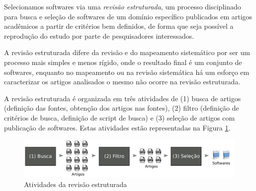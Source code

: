 Selecionamos softwares via uma {\it
revisão estruturada}, um processo disciplinado para busca e seleção de
softwares de um domínio específico publicados em artigos acadêmicos a partir de
critérios bem definidos, de forma que seja possível a reprodução do estudo por
parte de pesquisadores interessados.

A revisão estruturada difere da revisão e do mapeamento sistemático por ser um
processo mais simples e menos rígido, onde o resultado final é um conjunto de
softwares, enquanto no mapeamento ou na revisão sistemática há um esforço em
caracterizar os artigos analisados o mesmo não ocorre na revisão estruturada.

A revisão estruturada é organizada em três atividades de (1) busca de artigos
(definição das fontes, obtenção dos artigos nas fontes), (2) filtro (definição
de critérios de busca, definição de script de busca) e (3) seleção de artigos
com publicação de softwares. Estas atividades estão representadas na Figura
\ref{figura-revisao-estruturada}.

\begin{figure}[h]
  \center
  \includegraphics[scale=0.21]{imagens/revisao-estruturada.png}
  \caption{Atividades da revisão estruturada}
  \label{figura-revisao-estruturada}
\end{figure}

